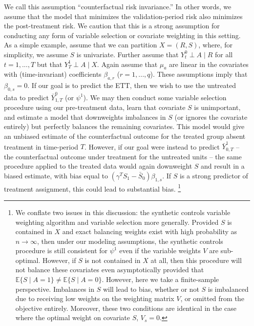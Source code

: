 \documentclass[article]{imsart}
\theoremstyle{plain}
\theoremstyle{remark}
\begin{document}
We call this assumption ``counterfactual risk invariance.'' In other words, we assume that the model that minimizes the validation-period risk also minimizes the post-treatment risk. We caution that this is a strong assumption for conducting any form of variable selection or covariate weighting in this setting. As a simple example, assume that we can partition $X = (R, S)$, where, for simplicity, we assume $S$ is univariate. Further assume that $Y^0_t \perp A \mid R$ for all $t = 1, ..., T$ but that $Y^1_T \perp A \mid X$. Again assume that $\mu_a$ are linear in the covariates with (time-invariant) coefficients $\beta_{a, r}$ ($r = 1, ..., q$). These assumptions imply that $\beta_{0, s} = 0$. If our goal is to predict the ETT, then we wish to use the untreated data to predict $\bar{Y}_{1, T}^0$ (or $\psi^1$). We may then conduct some variable selection procedure using our pre-treatment data, learn that covariate $S$ is unimportant, and estimate a model that downweights imbalances in $S$ (or ignores the covariate entirely) but perfectly balances the remaining covariates. This model would give an unbiased estimate of the counterfactual outcome for the treated group absent treatment in time-period $T$. However, if our goal were instead to predict $\bar{Y}^1_{0, T}$ -- the counterfactual outcome under treatment for the untreated units -- the same procedure applied to the treated data would again downweight $S$ and result in a biased estimate, with bias equal to $(\gamma^TS_1 - \bar{S}_0) \beta_{1, s}$. If $S$ is a strong predictor of treatment assignment, this could lead to substantial bias. \footnote{We conflate two issues in this discussion: the synthetic controls variable weighting algorithm and variable selection more generally. Provided $S$ is contained in $X$ and exact balancing weights exist with high probability as $n \to \infty$, then under our modeling assumptions, the synthetic controls procedure is still consistent for $\psi^1$ even if the variable weights $V$ are sub-optimal. However, if $S$ is not contained in $X$ at all, then this procedure will not balance these covariates even asymptotically provided that $\mathbb{E}\{S \mid A = 1\} \ne \mathbb{E}\{S \mid A = 0\}$. However, here we take a finite-sample perspective. Imbalances in $S$ will lead to bias, whether or not $S$ is imbalanced due to receiving low weights on the weighting matrix $V$, or omitted from the objective entirely. Moreover, these two conditions are identical in the case where the optimal weight on covariate $S$, $V_s = 0$.} 
\end{document}
